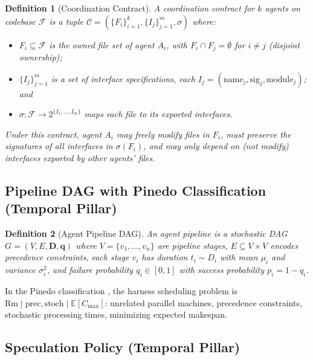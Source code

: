 \documentclass[11pt, a4paper, logo, copyright]{googledeepmind}
\newcommand{\E}{\mathbb{E}}
\newtheorem{definition}{Definition}[section]
\begin{document}
\begin{appendices}
\begin{definition}[Coordination Contract]
\label{def:ext-contract}
A \emph{coordination contract} for $k$ agents on codebase $\mathcal{F}$ is a
tuple $\mathcal{C} = (\{F_i\}_{i=1}^k, \{I_j\}_{j=1}^m, \sigma)$ where:
\begin{itemize}[nosep]
  \item $F_i \subseteq \mathcal{F}$ is the owned file set of agent $A_i$,
        with $F_i \cap F_j = \emptyset$ for $i \neq j$ (disjoint ownership);
  \item $\{I_j\}_{j=1}^m$ is a set of interface specifications,
        each $I_j = (\mathrm{name}_j, \mathrm{sig}_j, \mathrm{module}_j)$; and
  \item $\sigma: \mathcal{F} \to 2^{\{I_1,\ldots,I_m\}}$ maps each file to its
        exported interfaces.
\end{itemize}
Under this contract, agent $A_i$ may freely modify files in $F_i$,
must preserve the signatures of all interfaces in $\sigma(F_i)$,
and may only depend on (not modify) interfaces exported by other agents' files.
\end{definition}


\subsection{Pipeline DAG with Pinedo Classification (Temporal Pillar)}

\begin{definition}[Agent Pipeline DAG]
\label{def:ext-pipeline}
An agent pipeline is a stochastic DAG $G = (V, E, \mathbf{D}, \mathbf{q})$ where
$V = \{v_1, \ldots, v_n\}$ are pipeline stages,
$E \subseteq V \times V$ encodes precedence constraints,
each stage $v_i$ has duration $t_i \sim D_i$ with mean $\mu_i$ and
variance $\sigma_i^2$, and failure probability $q_i \in [0,1]$
with success probability $p_i = 1 - q_i$.
\end{definition}

In the Pinedo classification \citep{pinedo2016scheduling}, the harness scheduling
problem is $\mathrm{Rm} \mid \mathrm{prec}, \mathrm{stoch} \mid \E[C_{\max}]$:
unrelated parallel machines, precedence constraints, stochastic processing times,
minimizing expected makespan.


\subsection{Speculation Policy (Temporal Pillar)}


\end{appendices}
\end{document}
